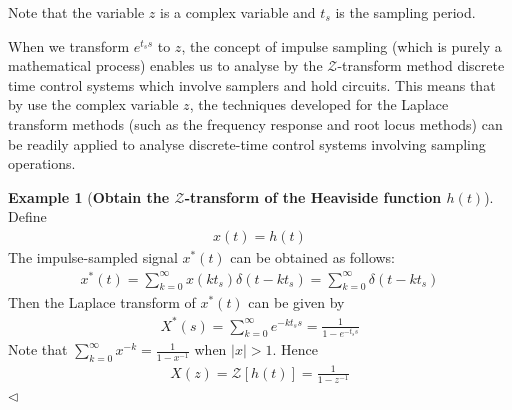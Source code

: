 \documentclass[11pt,a4paper,oneside]{book}
\numberwithin{equation}{section}
\newcommand{\abs}[1]{\big|#1\big|}
\theoremstyle{it}
\theoremstyle{definition}
\newtheorem{example}{Example}[chapter]
\begin{document}
Note that the variable $z$ is a complex variable and $t_s$ is the sampling period. 

When we transform $e^{t_ss}$ to $z$, the concept of impulse sampling (which is 
purely a mathematical process) enables us to analyse by the 
$\mathcal{Z}$-transform method discrete time control systems which involve 
samplers and hold 
circuits. This means that by use the complex variable $z$, the techniques 
developed for the Laplace transform methods (such as the frequency response and 
root locus methods) can be readily applied to analyse discrete-time control 
systems involving sampling operations.

\begin{example}[\textbf{Obtain the $\mathcal{Z}$-transform of the Heaviside 
function $h(t)$}]
	
Define 
\begin{equation*}
	\begin{split}
		x(t) = h(t) 
	\end{split}
\end{equation*}
The impulse-sampled signal $x^*(t)$ can be obtained as follows:
\begin{equation*}
	\begin{split}
		x^*(t) = \sum_{k=0}^{\infty} x(kt_s)\delta(t-kt_s) = \sum_{k=0}^{\infty} \delta(t-kt_s)
	\end{split}
\end{equation*}
Then the Laplace transform of $x^*(t)$ can be given by
\begin{equation*}
	\begin{split}
		X^*(s) = \sum_{k=0}^{\infty} e^{-kt_ss} = \frac{1}{1-e^{-t_ss}}
	\end{split}
\end{equation*}
Note that $\sum_{k=0}^{\infty}x^{-k} = \frac{1}{1-x^{-1}}$ when $\abs{x}>1$.
Hence
\begin{equation*}
	\begin{split}
		X(z) = \mathcal{Z} \left[ h(t) \right] = \frac{1}{1-z^{-1}}
	\end{split}
\end{equation*}
$\triangleleft$
\end{example}
\end{document}
